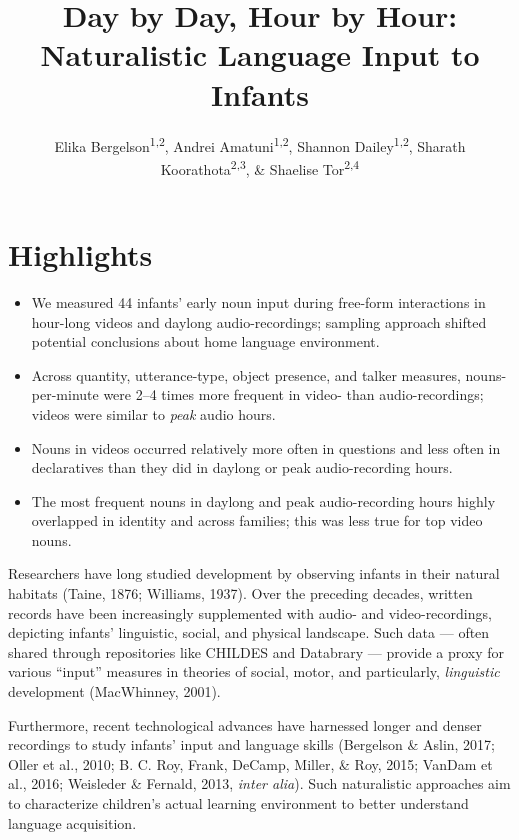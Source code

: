 \documentclass[man]{apa6}
\title{Day by Day, Hour by Hour: Naturalistic Language Input to Infants}
\author{Elika Bergelson\textsuperscript{1,2}, Andrei Amatuni\textsuperscript{1,2}, Shannon Dailey\textsuperscript{1,2}, Sharath Koorathota\textsuperscript{2,3}, \& Shaelise Tor\textsuperscript{2,4}}
\affiliation{
    \vspace{0.5cm}
          \textsuperscript{1} Duke University\\
          \textsuperscript{2} University of Rochester\\
          \textsuperscript{3} Columbia University Medical Center\\
          \textsuperscript{4} Syracuse University  }
\providecommand{\tightlist}{%
  \setlength{\itemsep}{0pt}\setlength{\parskip}{0pt}}
\theoremstyle{definition}
\theoremstyle{definition}
\theoremstyle{definition}
\theoremstyle{remark}
\begin{document}
\maketitle

\setcounter{secnumdepth}{0}



\section{Highlights}\label{highlights}

\begin{itemize}
\tightlist
\item
  We measured 44 infants' early noun input during free-form interactions
  in hour-long videos and daylong audio-recordings; sampling approach
  shifted potential conclusions about home language environment.
\item
  Across quantity, utterance-type, object presence, and talker measures,
  nouns-per-minute were 2--4 times more frequent in video- than
  audio-recordings; videos were similar to \emph{peak} audio hours.
\item
  Nouns in videos occurred relatively more often in questions and less
  often in declaratives than they did in daylong or peak audio-recording
  hours.
\item
  The most frequent nouns in daylong and peak audio-recording hours
  highly overlapped in identity and across families; this was less true
  for top video nouns.
\end{itemize}

Researchers have long studied development by observing infants in their
natural habitats (Taine, 1876; Williams, 1937). Over the preceding
decades, written records have been increasingly supplemented with audio-
and video-recordings, depicting infants' linguistic, social, and
physical landscape. Such data --- often shared through repositories like
CHILDES and Databrary --- provide a proxy for various \enquote{input}
measures in theories of social, motor, and particularly,
\emph{linguistic} development (MacWhinney, 2001).

Furthermore, recent technological advances have harnessed longer and
denser recordings to study infants' input and language skills (Bergelson
\& Aslin, 2017; Oller et al., 2010; B. C. Roy, Frank, DeCamp, Miller, \&
Roy, 2015; VanDam et al., 2016; Weisleder \& Fernald, 2013, \emph{inter
alia}). Such naturalistic approaches aim to characterize children's
actual learning environment to better understand language acquisition.
\end{document}

